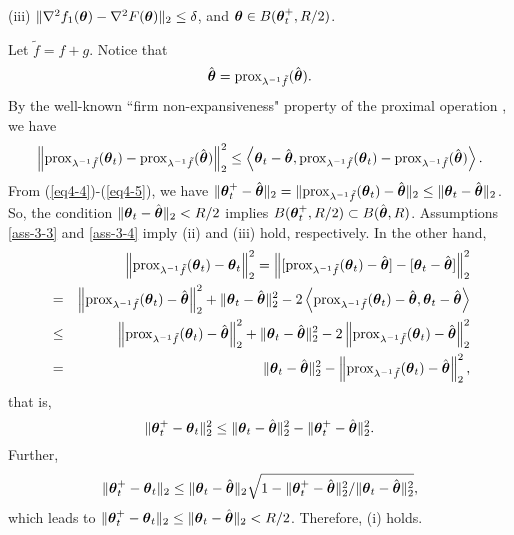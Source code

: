 \documentclass[12pt,a4paper]{article}%
\newcommand{\be}{\begin{equation}}
\newcommand{\ee}{\end{equation}}
\newcommand\bes{\begin{eqnarray}}
\newcommand\ees{\end{eqnarray}}
\newcommand \vc[1]{{\mbox{\boldmath${#1}$}}}
\newcommand \vtheta{\vc \theta}
\numberwithin{equation}{section}
\begin{document}
(iii) $\|\nabla^2 f_1(\vtheta)-\nabla^2 F(\vtheta)\|_2\leq \delta$, and $\vtheta\in B(\vtheta_t^+, R/2)$.

Let $\tilde{f}=f+g$. Notice that
\be\label{eq4-4}
\hat{\vtheta}=\mathrm{prox}_{\lambda^{-1}\tilde{f}}(\hat{\vtheta}).
\ee
By the well-known ``firm non-expansiveness" property of the proximal operation \citep{ParikhBoyd2014}, we have
\be\label{eq4-5}
\left\|\mathrm{prox}_{\lambda^{-1}\tilde{f}}(\vtheta_t)-\mathrm{prox}_{\lambda^{-1}\tilde{f}}(\hat{\vtheta})\right\|_2^2
\leq\left\langle\vtheta_t-\hat{\vtheta},\mathrm{prox}_{\lambda^{-1}\tilde{f}}(\vtheta_t)-\mathrm{prox}_{\lambda^{-1}\tilde{f}}(\hat{\vtheta})\right\rangle.
\ee
From (\ref{eq4-4})-(\ref{eq4-5}), we have $
\|\vtheta_t^+-\hat{\vtheta}\|_2=\|\mathrm{prox}_{\lambda^{-1}\tilde{f}}(\vtheta_t)-\hat{\vtheta}\|_2
\leq\|\vtheta_t-\hat{\vtheta}\|_2
$. So, the condition $\|\vtheta_t-\hat{\vtheta}\|_2<R/2$ implies $B(\vtheta_t^+,R/2)\subset B(\hat{\vtheta},R)$. Assumptions \ref{ass-3-3} and \ref{ass-3-4} imply (ii) and (iii) hold, respectively. In the other hand,
\bes
&&\left\|\mathrm{prox}_{\lambda^{-1}\tilde{f}}(\vtheta_t)-\vtheta_t\right\|_2^2=
\left\|[\mathrm{prox}_{\lambda^{-1}\tilde{f}}(\vtheta_t)-\hat{\vtheta}]-[\vtheta_t-\hat{\vtheta}]\right\|_2^2\nonumber\\
&=&\left\|\mathrm{prox}_{\lambda^{-1}\tilde{f}}(\vtheta_t)-\hat{\vtheta}\right\|_2^2+\|\vtheta_t-\hat{\vtheta}\|_2^2
-2\left\langle\mathrm{prox}_{\lambda^{-1}\tilde{f}}(\vtheta_t)-\hat{\vtheta},\vtheta_t-\hat{\vtheta}\right\rangle\nonumber\\
&\leq&\left\|\mathrm{prox}_{\lambda^{-1}\tilde{f}}(\vtheta_t)-\hat{\vtheta}\right\|_2^2+\|\vtheta_t-\hat{\vtheta}\|_2^2
-2\left\|\mathrm{prox}_{\lambda^{-1}\tilde{f}}(\vtheta_t)-\hat{\vtheta}\right\|_2^2\nonumber\\
&=&\|\vtheta_t-\hat{\vtheta}\|_2^2
-\left\|\mathrm{prox}_{\lambda^{-1}\tilde{f}}(\vtheta_t)-\hat{\vtheta}\right\|_2^2,\nonumber
\ees
that is,
$$
\|\vtheta_t^+-\vtheta_t\|_2^2\leq\|\vtheta_t-\hat{\vtheta}\|_2^2-\|\vtheta_t^+-\hat{\vtheta}\|_2^2.
$$
Further,
\be\label{eq4-6}
\|\vtheta_t^+-\vtheta_t\|_2\leq\|\vtheta_t-\hat{\vtheta}\|_2\sqrt{1-\|\vtheta_t^+-\hat{\vtheta}\|_2^2/\|\vtheta_t-\hat{\vtheta}\|_2^2},
\ee
which leads to $\|\vtheta_t^+-\vtheta_t\|_2\leq\|\vtheta_t-\hat{\vtheta}\|_2<R/2$.
Therefore, (i) holds.
\end{document}
